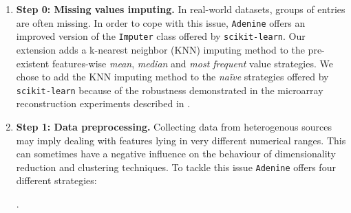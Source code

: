 \documentclass[twoside,11pt]{article}
\makeatletter
\newcommand{\ade}{\texttt{Adenine}\@\xspace}
\makeatother
\begin{document}
\begin{enumerate}
  \item[]{\bf Step 0: Missing values imputing.}
  In real-world datasets, groups of entries are often missing. In order to cope with this issue, \ade offers an improved version of the \texttt{Imputer} class offered by \texttt{scikit-learn}. Our extension adds a k-nearest neighbor (KNN) imputing method to the pre-existent features-wise \emph{mean}, \emph{median} and \emph{most frequent} value strategies.
  We chose to add the KNN imputing method to the \emph{na\"ive} strategies offered by \texttt{scikit-learn} because of the robustness demonstrated in the microarray reconstruction experiments described in \citep{troyanskaya2001missing}.

  \item[]{\bf Step 1: Data preprocessing.}
  Collecting data from heterogenous sources may imply dealing with features lying in very different numerical ranges. This can sometimes have a negative influence on the behaviour of dimensionality reduction and clustering techniques. To tackle this issue \ade offers four different strategies:
  .


\end{enumerate}
\end{document}
